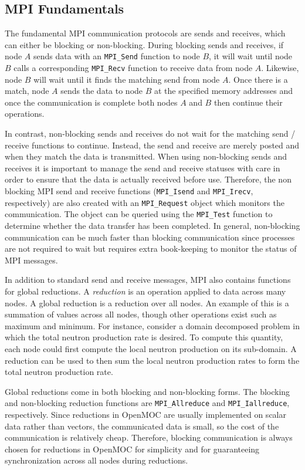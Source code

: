 \subsection{MPI Fundamentals}

The fundamental \ac{MPI} communication protocols are sends and receives, which can either be blocking or non-blocking. During blocking sends and receives, if node $A$ sends data with an \texttt{MPI_Send} function to node $B$, it will wait until node $B$ calls a corresponding \texttt{MPI_Recv} function to receive data from node $A$. Likewise, node $B$ will wait until it finds the matching send from node $A$. Once there is a match, node $A$ sends the data to node $B$ at the specified memory addresses and once the communication is complete both nodes $A$ and $B$ then continue their operations.

In contrast, non-blocking sends and receives do not wait for the matching send / receive functions to continue. Instead, the send and receive are merely posted and when they match the data is transmitted. When using non-blocking sends and receives it is important to manage the send and receive statuses with care in order to ensure that the data is actually received before use. Therefore, the non blocking \ac{MPI} send and receive functions (\texttt{MPI_Isend} and \texttt{MPI_Irecv}, respectively) are also created with an \texttt{MPI_Request} object which monitors the communication. The object can be queried using the \texttt{MPI_Test} function to determine whether the data transfer has been completed. In general, non-blocking communication can be much faster than blocking communication since processes are not required to wait but requires extra book-keeping to monitor the status of \ac{MPI} messages.

In addition to standard send and receive messages, \ac{MPI} also contains functions for global reductions. A \textit{reduction} is an operation applied to data across many nodes. A global reduction is a reduction over all nodes. An example of this is a summation of values across all nodes, though other operations exist such as maximum and minimum. For instance, consider a domain decomposed problem in which the total neutron production rate is desired. To compute this quantity, each node could first compute the local neutron production on its sub-domain. A reduction can be used to then sum the local neutron production rates to form the total neutron production rate.

Global reductions come in both blocking and non-blocking forms. The blocking and non-blocking reduction functions are \texttt{MPI_Allreduce} and \texttt{MPI_Iallreduce}, respectively. Since reductions in OpenMOC are usually implemented on scalar data rather than vectors, the communicated data is small, so the cost of the communication is relatively cheap. Therefore, blocking communication is always chosen for reductions in OpenMOC for simplicity and for guaranteeing synchronization across all nodes during reductions.

